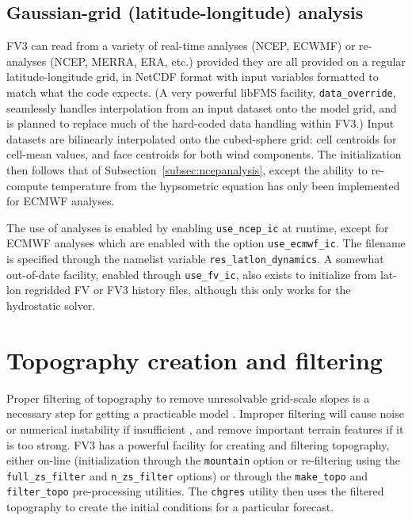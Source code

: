 \documentclass[10pt,letterpaper,margin=1in]{memoir}
\begin{document}
\subsection{Gaussian-grid (latitude-longitude) analysis}

FV3 can read from a variety of real-time analyses (NCEP, ECWMF) or re-analyses (NCEP, MERRA, ERA, etc.) provided they are all provided on a regular latitude-longitude grid, in NetCDF format with input variables formatted to match what the code expects. (A very powerful libFMS facility, \texttt{data_override}, seamlessly handles interpolation from an input dataset onto the model grid, and is planned to replace much of the hard-coded data handling within FV3.) Input datasets are bilinearly interpolated onto the cubed-sphere grid: cell centroids for cell-mean values, and face centroids for both wind components. The initialization then follows that of Subsection~\ref{subsec:ncepanalysis}, except the ability to re-compute temperature from the hypsometric equation has only been implemented for ECMWF analyses.

The use of analyses is enabled by enabling \texttt{use_ncep_ic} at runtime, except for ECMWF analyses which are enabled with the option \texttt{use_ecmwf_ic}. The filename is specified through the namelist variable \texttt{res_latlon_dynamics}.
A somewhat out-of-date facility, enabled through  \texttt{use_fv_ic}, also exists to initialize from lat-lon regridded FV or FV3 history files, although this only works for the hydrostatic solver.


\section{Topography creation and filtering}

Proper filtering of topography to remove unresolvable grid-scale slopes is a necessary step for getting a practicable model \citep{Lindberg1996}. Improper filtering will cause noise or numerical instability if insufficient \citep{Park2016}, and remove important terrain features if it is too strong. FV3 has a powerful facility for creating and filtering topography, either on-line (initialization through the \texttt{mountain} option or re-filtering using the \texttt{{full_zs_filter}} and \texttt{{n_zs_filter}} options) or through the \texttt{{make_topo}} and \texttt{{filter_topo}} pre-processing utilities. The \texttt{chgres} utility then uses the filtered topography to create the initial conditions for a particular forecast.
\end{document}

